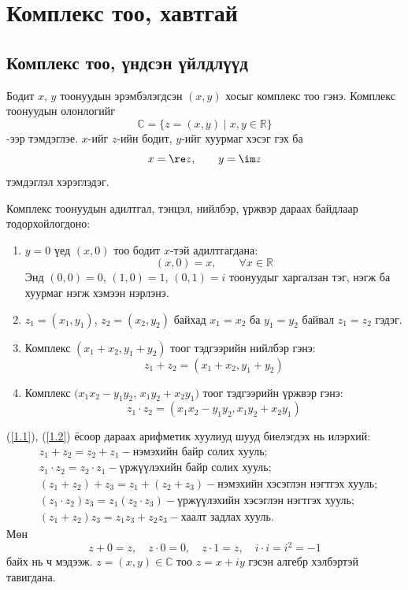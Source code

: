 \chapter{Комплекс тоо, хавтгай}
\section{Комплекс тоо, үндсэн үйлдлүүд}
\begin{dfn}
Бодит $x$, $y$ тоонуудын эрэмбэлэгдсэн $(x,y)$ хосыг комплекс тоо гэнэ. Комплекс тоонуудын олонлогийг $$\mathbb{C}=\{z=(x,y)\mid x, y \in\mathbb{R}\}$$-ээр тэмдэглэе. 
$x$-ийг $z$-ийн бодит, $y$-ийг хуурмаг хэсэг  гэх ба
$$x=\re z, \qquad y=\im z$$
тэмдэглэл хэрэглэдэг. 
\end{dfn}
Комплекс тоонуудын адилтгал, тэнцэл, нийлбэр, үржвэр дараах байдлаар тодорхойлогдоно:
\begin{enumerate}
    \item [1)] $y=0$ үед $(x,0)$ тоо бодит $x$-тэй адилтгагдана: 
    $$(x,0)=x, \qquad \forall x\in\mathbb{R}$$
Энд $(0,0)=0$, $(1,0)=1$, $(0,1)=i$ тоонуудыг харгалзан тэг, нэгж ба хуурмаг нэгж  хэмээн нэрлэнэ.
\item [2)] $z_1=(x_1,y_1)$, $z_2=(x_2,y_2)$ байхад $x_1=x_2$ ба $y_1=y_2$ байвал $z_1=z_2$ гэдэг.
\item [3)] Комплекс $(x_1+x_2, y_1+y_2)$ тоог тэдгээрийн нийлбэр  гэнэ:
\begin{equation}\label{1.1}
    z_1+z_2=(x_1+x_2,y_1+y_2)
\end{equation} 
\item[4)] Комплекс $(x_1x_2-y_1y_2$, $x_1y_2+x_2y_1)$ тоог тэдгээрийн үржвэр гэнэ:
\begin{equation}\label{1.2}
    z_1\cdot z_2=(x_1x_2-y_1y_2 , x_1y_2+x_2y_1)
\end{equation} 
\end{enumerate}
(\ref{1.1}), (\ref{1.2}) ёсоор дараах арифметик хуулиуд шууд биелэгдэх нь илэрхий: 
\begin{align*}
&z_1+z_2=z_2+z_1  - \text {нэмэхийн байр солих хууль};\\
&z_1\cdot z_2=z_2\cdot z_1 - \text {үржүүлэхийн байр солих хууль}; \\
&(z_1+z_2)+z_3=z_1+(z_2+z_3) - \text {нэмэхийн хэсэглэн нэгтгэх хууль}; \\
&(z_1\cdot z_2)z_3=z_1(z_2\cdot z_3) - \text {үржүүлэхийн хэсэглэн нэгтгэх хууль}; \\ 
&(z_1+z_2) z_3=z_1z_3+z_2z_3 - \text {хаалт задлах хууль}.
\end{align*}
Мөн
$$z+0=z, \quad z\cdot 0 =0,\quad z\cdot 1=z, \quad i\cdot i=i^2=-1$$
байх нь ч мэдээж. $z=(x,y)\in \mathbb{C}$ тоо $z=x+iy$ гэсэн алгебр хэлбэртэй тавигдана.

